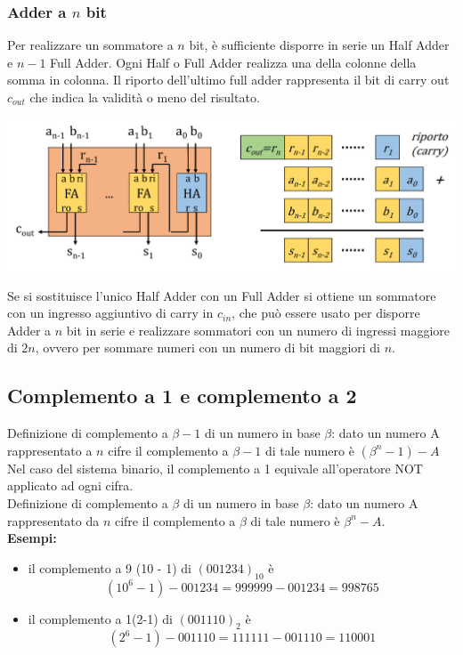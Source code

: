 \documentclass{article}
\begin{document}
\subsubsection{Adder a $n$ bit}
Per realizzare un sommatore a $n$ bit, è sufficiente disporre in serie un Half Adder e $n-1$ Full Adder. Ogni Half o Full Adder realizza una della colonne della somma in colonna. Il riporto dell’ultimo full adder rappresenta il bit di {\color{cyan}carry out} $c_{out}$ che indica la validità o meno del risultato.
\begin{center}
    \includegraphics[scale=0.35]{adder n bit.png}
\end{center}
\vspace{0.3cm}
Se si sostituisce l’unico Half Adder con un Full Adder si ottiene un sommatore con un ingresso aggiuntivo di carry in $c_{in}$, che può essere usato per disporre Adder a $n$ bit in serie e realizzare sommatori con un numero di ingressi maggiore di $2n$, ovvero per sommare numeri con un numero di bit maggiori di $n$.



\subsection{Complemento a 1 e complemento a 2}
Definizione di {\color{cyan} complemento a $\beta -1$} di un numero in base $\beta$: dato un numero A rappresentato a $n$ cifre il complemento a $\beta -1$ di tale numero è $(\beta ^n  -1) - A $
Nel caso del sistema binario, il complemento a 1 equivale all’operatore NOT applicato ad ogni cifra.
\vspace{0.1cm}\\
Definizione di {\color{cyan}complemento a $\beta$} di un numero in base $\beta$: dato un numero A rappresentato da $n$ cifre il complemento a $\beta$ di tale numero è $\beta ^n -A$.
\vspace{0.1cm}\\
\textbf{Esempi:}
\begin{itemize}
    \item il complemento a 9 (10 - 1) di $(001234)_{10}$ è 
    $$ (10^6-1)-001234 = 999999-001234=998765 $$
    \item il complemento a 1(2-1) di $(001110)_2$ è
    $$ (2^6-1)-001110 = 111111 - 001110 = 110001 $$
\end{itemize}
\end{document}
